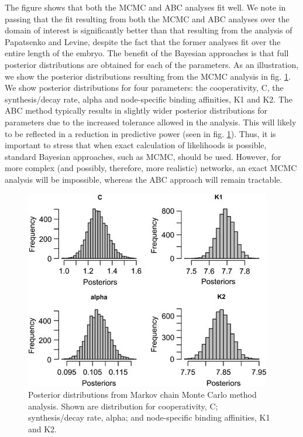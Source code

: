 The figure shows that both the MCMC and ABC analyses fit well. We note in passing that the fit resulting from both the MCMC and ABC analyses over the domain of interest is significantly better than that resulting from the analysis of Papatsenko and Levine, despite the fact that the former analyses fit over the entire length of the embryo. The benefit of the Bayesian approaches is that full posterior distributions are obtained for each of the parameters. As an illustration, we show the posterior distributions resulting from the MCMC analysis in fig. \ref{fig:review3}. We show posterior distributions for four parameters: the cooperativity, C, the synthesis/decay rate, alpha and node-specific binding affinities, K1 and K2. The ABC method typically results in slightly wider posterior distributions for parameters due to the increased tolerance allowed in the analysis. This will likely to be reflected in a reduction in predictive power (seen in fig. \ref{fig:review3}). Thus, it is important to stress that when exact calculation of likelihoods is possible, standard Bayesian approaches, such as MCMC, should be used. However, for more complex (and possibly, therefore, more realistic) networks, an exact MCMC analysis will be impossible, whereas the ABC approach will remain tractable.

\begin{figure}
    \centering
    \includegraphics{tex/review/hdy201352f3.jpg}
    \caption{Posterior distributions from Markov chain Monte Carlo method analysis. Shown are distribution for cooperativity, C; synthesis/decay rate, alpha; and node-specific binding affinities, K1 and K2.}
    \label{fig:review3}
\end{figure}

